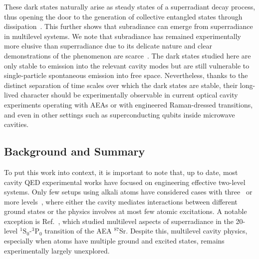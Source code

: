 \documentclass[aps,prx,superscriptaddress,twocolumn,notitlepage,nofootinbib,longbibliography]{revtex4-2}
\begin{document}
These dark states  naturally arise as steady states of a superradiant decay process,
thus opening the door to the generation of collective entangled states through dissipation~\cite{Verstraete2009,Zoller2012}.
This further shows that subradiance can emerge from superradiance  in multilevel systems.
We note that subradiance has remained experimentally more elusive than superradiance due to its delicate nature and clear demonstrations of the phenomenon are scarce~\cite{DeVoePRL76, CrubellierPavolini_PRL1985, TemnovPRL95, EschnerNature2001, HettichScience2002, JulienneTakasuPRL108, ZelevinskyNatPhys2015, ZhouNature2011, WallraffScience2013, WallraffFilipp_PRA84, KaiserPRL116, SolanoNatComm2017, BlochRui_Nature2020,Wang_PRL124,BrowaeysFerioli_PRX2021}. The dark states studied here are only stable to emission into the relevant cavity modes  but are still vulnerable to single-particle spontaneous emission into free space. Nevertheless,   thanks to  the distinct separation of time scales over which  the dark states are  stable, their long-lived character   should be  experimentally  observable in current optical cavity experiments operating with AEAs or with engineered Raman-dressed transitions, and even in other settings such as  superconducting qubits \cite{Burkard2004}  inside microwave cavities.




\subsection{Background and Summary\label{sec:summary}}


To put this work into context, it is important to note that, up to date, most cavity QED experimental works have focused on engineering effective two-level systems. Only few setups using alkali atoms have considered cases with three~\cite{Orozco_NatPhys2009, Chapman_NatPhys2012, BarrettZhiqiang_OSA2017, EsslingerLandini_PRL2018, EsslingerMorales_PRA2019, SchleierSmithDavis_PRL2019, SchleierSmithDavis_PRL2020} or more levels~\cite{CarmichaelNorris_PRL105,BarrettArnold_PRA84,JessenDeutsch_Arx2018,StamperKurnKohler_PRL2018}, where either the cavity mediates interactions between different ground states or the physics involves at most few atomic excitations.
A notable exception is Ref.~\cite{ThompsonNorcia_PRX2018}, which studied multilevel aspects of superradiance in the 20-level $^1\text{S}_0$-$^3\text{P}_0$ transition of the AEA $^{87}$Sr. Despite this, multilevel cavity physics, especially when atoms have multiple ground and excited states, remains experimentally largely unexplored.
\end{document}
